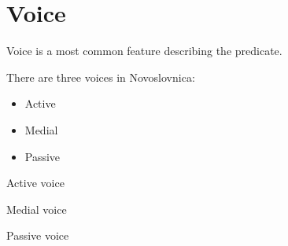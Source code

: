 \section{Voice}

Voice is a most common feature describing the predicate.

There are three voices in Novoslovnica:

\begin{itemize}
	\item Active
	\item Medial
	\item Passive
\end{itemize}

Active voice 

Medial voice

Passive voice
